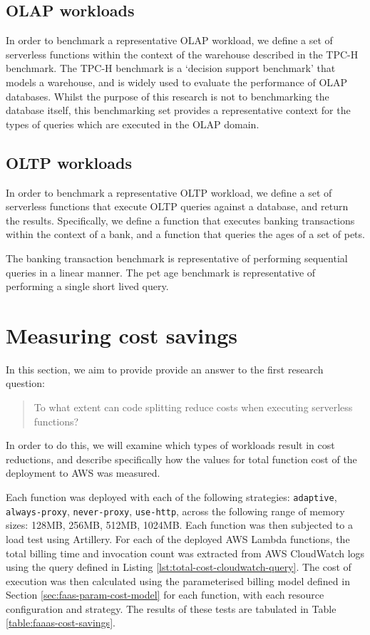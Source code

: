 \subsection{OLAP workloads}
In order to benchmark a representative OLAP workload, we define a set of serverless functions within the context of the warehouse described in the TPC-H benchmark. The TPC-H benchmark is a `decision support benchmark' that models a warehouse, and is widely used to evaluate the performance of OLAP databases. Whilst the purpose of this research is not to benchmarking the database itself, this benchmarking set provides a representative context for the types of queries which are executed in the OLAP domain.

\subsection{OLTP workloads}
In order to benchmark a representative OLTP workload, we define a set of serverless functions that execute OLTP queries against a database, and return the results. Specifically, we define a function that executes banking transactions within the context of a bank, and a function that queries the ages of a set of pets.

The banking transaction benchmark is representative of performing sequential queries in a linear manner. The pet age benchmark is representative of performing a single short lived query.

\section{Measuring cost savings}
In this section, we aim to provide provide an answer to the first research question: \blockquote{To what extent can code splitting reduce costs when executing serverless functions?}. In order to do this, we will examine which types of workloads result in cost reductions, and describe specifically how the values for total function cost of the \faaas{} deployment to AWS was measured.

Each function was deployed with each of the following strategies: \verb|adaptive|, \verb|always-proxy|, \verb|never-proxy|, \verb|use-http|, across the following range of memory sizes: 128MB, 256MB, 512MB, 1024MB. Each function was then subjected to a load test using Artillery\cite{artilleryArtilleryCloudscaleLoad}. For each of the deployed AWS Lambda functions, the total billing time and invocation count was extracted from AWS CloudWatch logs using the query defined in Listing \ref{lst:total-cost-cloudwatch-query}. The cost of execution was then calculated using the parameterised billing model defined in Section \ref{sec:faas-param-cost-model} for each function, with each resource configuration and strategy. The results of these tests are tabulated in Table \ref{table:faaas-cost-savings}.

